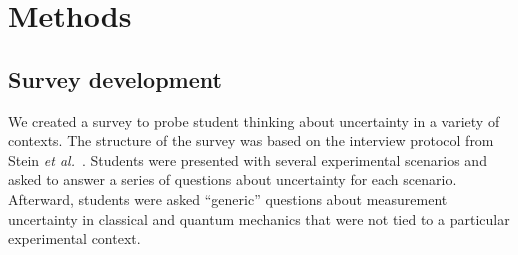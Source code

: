 \documentclass[english,aps,prstper,reprint,showpacs,longbibliography,superscriptaddress,nofootinbib]{revtex4-2}
\begin{document}
\section{Methods}


\subsection{Survey development}
\label{sec:survey}

We created a survey to probe student thinking about uncertainty in a variety of contexts. The structure of the survey was based on the interview protocol from Stein \textit{et al.}~\cite{Stein2019}. Students were presented with several experimental scenarios and asked to answer a series of questions about uncertainty for each scenario. Afterward, students were asked ``generic'' questions about measurement uncertainty in classical and quantum mechanics that were not tied to a particular experimental context. 
\end{document}
